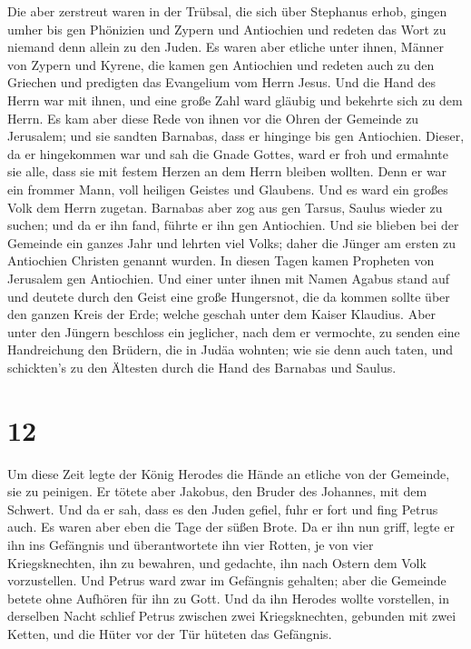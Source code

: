  Die aber zerstreut waren in der Trübsal, die sich über
Stephanus erhob, gingen umher bis gen Phönizien und Zypern und
Antiochien und redeten das Wort zu niemand denn allein zu den Juden.
 Es waren aber etliche unter ihnen, Männer von Zypern und
Kyrene, die kamen gen Antiochien und redeten auch zu den Griechen und
predigten das Evangelium vom Herrn Jesus.  Und die Hand
des Herrn war mit ihnen, und eine große Zahl ward gläubig und bekehrte
sich zu dem Herrn.  Es kam aber diese Rede von ihnen vor
die Ohren der Gemeinde zu Jerusalem; und sie sandten Barnabas, dass er
hinginge bis gen Antiochien.  Dieser, da er hingekommen
war und sah die Gnade Gottes, ward er froh und ermahnte sie alle, dass
sie mit festem Herzen an dem Herrn bleiben wollten.  Denn
er war ein frommer Mann, voll heiligen Geistes und Glaubens. Und es ward
ein großes Volk dem Herrn zugetan.  Barnabas aber zog aus
gen Tarsus, Saulus wieder zu suchen;  und da er ihn fand,
führte er ihn gen Antiochien. Und sie blieben bei der Gemeinde ein
ganzes Jahr und lehrten viel Volks; daher die Jünger am ersten zu
Antiochien Christen genannt wurden.  In diesen Tagen
kamen Propheten von Jerusalem gen Antiochien.  Und einer
unter ihnen mit Namen Agabus stand auf und deutete durch den Geist eine
große Hungersnot, die da kommen sollte über den ganzen Kreis der Erde;
welche geschah unter dem Kaiser Klaudius.  Aber unter den
Jüngern beschloss ein jeglicher, nach dem er vermochte, zu senden eine
Handreichung den Brüdern, die in Judäa wohnten;  wie sie
denn auch taten, und schickten's zu den Ältesten durch die Hand des
Barnabas und Saulus.

\hypertarget{section-11}{%
\section{12}\label{section-11}}

 Um diese Zeit legte der König Herodes die Hände an
etliche von der Gemeinde, sie zu peinigen.  Er tötete aber
Jakobus, den Bruder des Johannes, mit dem Schwert.  Und da
er sah, dass es den Juden gefiel, fuhr er fort und fing Petrus auch. Es
waren aber eben die Tage der süßen Brote.  Da er ihn nun
griff, legte er ihn ins Gefängnis und überantwortete ihn vier Rotten, je
von vier Kriegsknechten, ihn zu bewahren, und gedachte, ihn nach Ostern
dem Volk vorzustellen.  Und Petrus ward zwar im Gefängnis
gehalten; aber die Gemeinde betete ohne Aufhören für ihn zu Gott.
 Und da ihn Herodes wollte vorstellen, in derselben Nacht
schlief Petrus zwischen zwei Kriegsknechten, gebunden mit zwei Ketten,
und die Hüter vor der Tür hüteten das Gefängnis.

